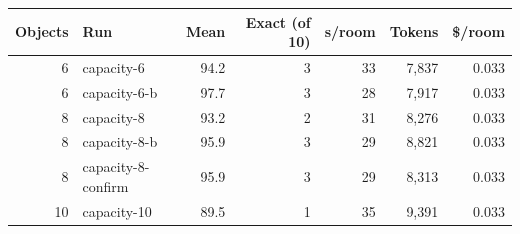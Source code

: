 \begin{tabular}{@{}rlrrrrr@{}}
\toprule
Objects & Run & Mean & Exact (of 10) & s/room & Tokens & \$/room \\
\midrule
6 & capacity-6 & 94.2 & 3 & 33 & 7,837 & 0.033 \\
6 & capacity-6-b & 97.7 & 3 & 28 & 7,917 & 0.033 \\
8 & capacity-8 & 93.2 & 2 & 31 & 8,276 & 0.033 \\
8 & capacity-8-b & 95.9 & 3 & 29 & 8,821 & 0.033 \\
8 & capacity-8-confirm & 95.9 & 3 & 29 & 8,313 & 0.033 \\
10 & capacity-10 & 89.5 & 1 & 35 & 9,391 & 0.033 \\
\bottomrule
\end{tabular}
